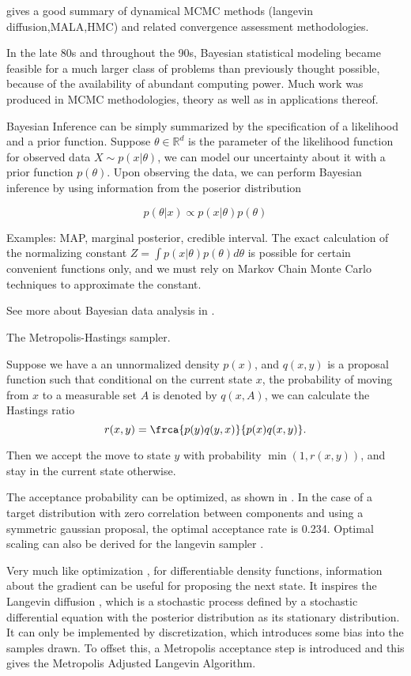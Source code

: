 \documentclass{book}
\begin{document}
\cite{green2015bayesian} gives a good summary of dynamical MCMC methods (langevin diffusion,MALA,HMC) and related convergence assessment methodologies.

In the late 80s and throughout the 90s, Bayesian statistical modeling became
feasible for a much larger class of problems than previously thought possible,
because of the availability of abundant computing power. Much work was produced
in MCMC methodologies\cite{robert2013monte}, theory\cite{tierney1994markov,roberts2004general} as well as in applications thereof.  

Bayesian Inference can be simply summarized by the specification of a likelihood and a prior function. Suppose $\theta \in \mathbb{R}^d$ is the parameter of the likelihood function for observed data $X \sim p(x| \theta)$, we can
model our uncertainty about it with a prior function $p(\theta)$. Upon observing the data, we can perform Bayesian inference by using information from the poserior distribution 

\[ p(\theta | x ) \propto p(x | \theta) p(\theta) \]

Examples: MAP, marginal posterior, credible interval. The exact calculation of the normalizing constant $Z = \int p(x | \theta) p(\theta) d\theta $ is possible for certain convenient functions only, and we must rely on Markov Chain Monte Carlo techniques to approximate the constant. 

See more about Bayesian data analysis in \cite{gelman2014bayesian}. 

The Metropolis-Hastings sampler.

Suppose we have a an unnormalized density $p(x)$, and $q(x,y)$ is a proposal function such that conditional on the current state $x$, the probability of moving from $x$ to a measurable set $A$ is denoted by $q(x,A)$, we can calculate the Hastings ratio
\[ r(x,y) = \frca{p(y)q(y,x)}{p(x)q(x,y)}. \]

Then we accept the move to state $y$ with probability $ \min (1, r(x,y)) $, and stay in the current state otherwise.

The acceptance probability can be optimized, as shown in \cite{roberts1997weak,gelman1996efficient,roberts2001optimal}. In the case of a target distribution with zero correlation between components and using a symmetric gaussian proposal, the optimal acceptance rate is 0.234. Optimal scaling can also be derived for the langevin sampler \cite{roberts1998optimal}.

Very much like optimization \cite{wright1999numerical}, for differentiable density
functions, information about the gradient can be useful for proposing the next
state. It inspires the Langevin diffusion \cite{}, which is a stochastic process
defined by a stochastic differential equation with the posterior distribution as
its stationary distribution. It can only be implemented by discretization, which
introduces some bias into the samples drawn. To offset this, a Metropolis
acceptance step is introduced and this gives the Metropolis Adjusted Langevin
Algorithm. 
\end{document}
